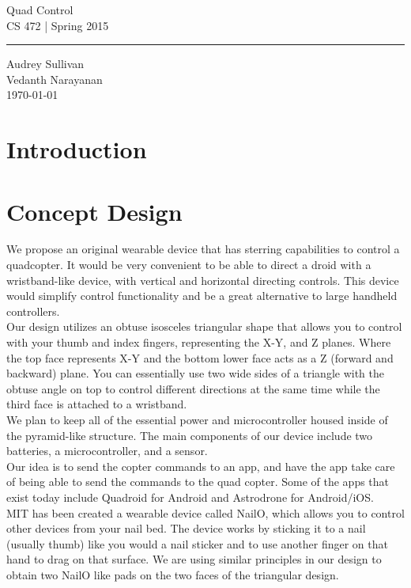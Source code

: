 \documentclass[12pt,letterpaper]{article}
\begin{document}
\begin{titlepage}
    \vspace*{4cm}
    \begin{flushright}
    {\huge
        Quad Control\\[5mm]
    }
    {\large
        CS 472 | Spring 2015
     }
    \end{flushright}
\hrule
    \begin{flushright}
	Audrey Sullivan\\
	Vedanth Narayanan\\
    \vfill
	\today\\
    \end{flushright}
\end{titlepage}

\raggedright

\section*{Introduction}

\section*{Concept Design}
We propose an original wearable device that has sterring capabilities to control a quadcopter. It would be very convenient to be able to direct a droid with a wristband-like device, with vertical and horizontal directing controls. This device would simplify control functionality and be a great alternative to large handheld controllers.\\
Our design utilizes an obtuse isosceles triangular shape that allows you to control with your thumb and index fingers, representing the X-Y, and Z planes. Where the top face represents X-Y and the bottom lower face acts as a Z (forward and backward) plane. You can essentially use two wide sides of a triangle with the obtuse angle on top to control different directions at the same time while the third face is attached to a wristband.\\
We plan to keep all of the essential power and microcontroller housed inside of the pyramid-like structure. The main components of our device include two batteries, a microcontroller, and a sensor.\\
Our idea is to send the copter commands to an app, and have the app take care of being able to send the commands to the quad copter. Some of the apps that exist today include Quadroid for Android and Astrodrone for Android/iOS. \\
MIT has been created a wearable device called NailO, which allows you to control other devices from your nail bed. The device works by sticking it to a nail (usually thumb) like you would a nail sticker and to use another finger on that hand to drag on that surface. We are using similar principles in our design to obtain two NailO like pads on the two faces of the triangular design. \\
\end{document}
